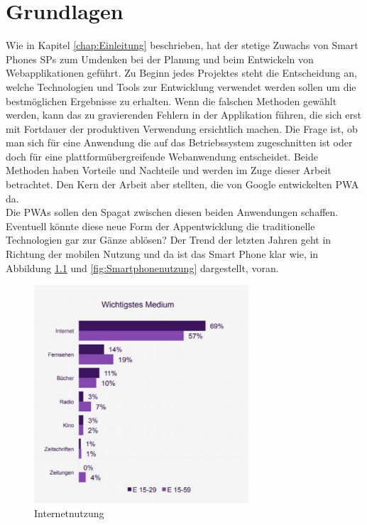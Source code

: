 \chapter{Grundlagen}
\thispagestyle{standard}
\pagestyle{standard}
\renewcommand{\footrulewidth}{0.4pt}

Wie in Kapitel \ref{chap:Einleitung} beschrieben, hat der stetige Zuwachs von Smart Phones \acs{SP}s \cite{Geraetenutzung} zum Umdenken bei der Planung und beim Entwickeln von Webapplikationen geführt.
Zu Beginn jedes Projektes steht die Entscheidung an, welche Technologien und Tools zur Entwicklung verwendet werden sollen um die bestmöglichen Ergebnisse zu erhalten.
Wenn die falschen Methoden gewählt werden, kann das zu gravierenden Fehlern in der Applikation führen, die sich erst mit Fortdauer der produktiven Verwendung ersichtlich machen. 
Die Frage ist, ob man sich für eine Anwendung die auf das Betriebssystem zugeschnitten ist oder doch für eine plattformübergreifende Webanwendung entscheidet. Beide Methoden haben Vorteile und Nachteile und werden im Zuge dieser Arbeit betrachtet. Den Kern der Arbeit aber stellten, die von Google entwickelten \acs{PWA} \cite{PWA} da. \\Die \acs{PWA}s sollen den Spagat zwischen diesen beiden Anwendungen schaffen. Eventuell könnte diese neue Form der Appentwicklung die traditionelle Technologien gar zur Gänze ablösen?
Der Trend der letzten Jahren geht in Richtung der mobilen Nutzung und da ist das Smart Phone klar wie, in Abbildung \ref{fig:Internetnutzung} und \ref{fig:Smartphonenutzung} dargestellt, voran.  

\begin{figure}[h]
	\centering
	\includegraphics[width=8cm]{BilderAllgemein/Internetnutzung}\medskip
	\caption{Internetnutzung \cite{Geraetenutzung}}
	\label{fig:Internetnutzung}
\end{figure}

